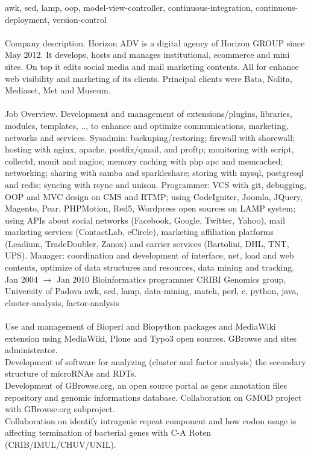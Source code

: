 \documentclass[9pt]{stackoverflow} %
\begin{document}
\begin{tcolorbox}
{\begin{entrylist}
		{{awk, sed, lamp, oop, model-view-controller, continuous-integration, continuous-deployment, version-control}\\\\
		Company description. Horizon ADV is a digital agency of Horizon GROUP since May 2012. It develops, hosts and manages
		institutional, ecommerce and mini sites. On top it edits social media and mail marketing contents. All for enhance web
		visibility and marketing of its clients. Principal clients were Bata, Nolita, Mediaset, Met and Museum.\\\\
		Job Overview. Development and management of extensions/plugins, libraries, modules, templates, .., to enhance and optimize
		communications, marketing, networks and services. Sysadmin: backuping/restoring; firewall with shorewall; hosting with
		nginx, apache, postfix/qmail, and proftp; monitoring with script, collectd, monit and nagios; memory caching with php apc and
		memcached; networking; sharing with samba and sparkleshare; storing with mysql, postgresql and redis; syncing with rsync
		and unison. Programmer: VCS with git, debugging, OOP and MVC design on CMS and RTMP; using CodeIgniter, Joomla, JQuery,
		Magento, Pear, PHPMotion, Red5, Wordpress open sources on LAMP system; using APIs about social networks (Facebook, Google, Twitter, Yahoo),
		mail marketing services (ContactLab, eCircle), marketing affiliation platforms (Leadium, TradeDoubler, Zanox) and carrier services (Bartolini, DHL, TNT, UPS).
		Manager: coordination and development of interface, net, load and web contents, optimize of data structures and resources, data mining and tracking.}
	\entry
		{Jan 2004 $\rightarrow$ Jan 2010}
		{Bioinformatics programmer}
		{CRIBI Genomics group, University of Padova}
		{{awk, sed, lamp, data-mining, match, perl, c, python, java, cluster-analysis, factor-analysis}\\\\
		Use and management of Bioperl and Biopython packages and MediaWiki extension using MediaWiki, Plone and Typo3 open sources. GBrowse and sites administrator.\\
		Development of software for analyzing (cluster and factor analysis) the secondary structure of microRNAs and RDTs.\\
		Development of GBrowse.org, an open source portal as gene annotation files repository and genomic informations database.
		Collaboration on GMOD project with GBrowse.org subproject.\\
		Collaboration on identify intragenic repeat component and how codon usage is affecting termination of bacterial genes with C-A Roten (CRIB/IMUL/CHUV/UNIL).\\
}
\end{entrylist}}
\end{tcolorbox}
\end{document}

